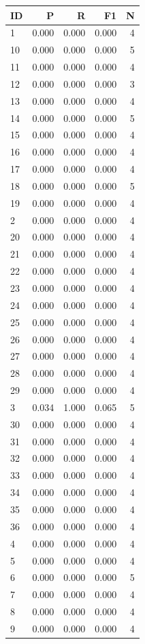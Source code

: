 \begin{tabular}{lrrrr}\toprule ID & P & R & F1 & N \\\midrule
1 & 0.000 & 0.000 & 0.000 & 4 \\
10 & 0.000 & 0.000 & 0.000 & 5 \\
11 & 0.000 & 0.000 & 0.000 & 4 \\
12 & 0.000 & 0.000 & 0.000 & 3 \\
13 & 0.000 & 0.000 & 0.000 & 4 \\
14 & 0.000 & 0.000 & 0.000 & 5 \\
15 & 0.000 & 0.000 & 0.000 & 4 \\
16 & 0.000 & 0.000 & 0.000 & 4 \\
17 & 0.000 & 0.000 & 0.000 & 4 \\
18 & 0.000 & 0.000 & 0.000 & 5 \\
19 & 0.000 & 0.000 & 0.000 & 4 \\
2 & 0.000 & 0.000 & 0.000 & 4 \\
20 & 0.000 & 0.000 & 0.000 & 4 \\
21 & 0.000 & 0.000 & 0.000 & 4 \\
22 & 0.000 & 0.000 & 0.000 & 4 \\
23 & 0.000 & 0.000 & 0.000 & 4 \\
24 & 0.000 & 0.000 & 0.000 & 4 \\
25 & 0.000 & 0.000 & 0.000 & 4 \\
26 & 0.000 & 0.000 & 0.000 & 4 \\
27 & 0.000 & 0.000 & 0.000 & 4 \\
28 & 0.000 & 0.000 & 0.000 & 4 \\
29 & 0.000 & 0.000 & 0.000 & 4 \\
3 & 0.034 & 1.000 & 0.065 & 5 \\
30 & 0.000 & 0.000 & 0.000 & 4 \\
31 & 0.000 & 0.000 & 0.000 & 4 \\
32 & 0.000 & 0.000 & 0.000 & 4 \\
33 & 0.000 & 0.000 & 0.000 & 4 \\
34 & 0.000 & 0.000 & 0.000 & 4 \\
35 & 0.000 & 0.000 & 0.000 & 4 \\
36 & 0.000 & 0.000 & 0.000 & 4 \\
4 & 0.000 & 0.000 & 0.000 & 4 \\
5 & 0.000 & 0.000 & 0.000 & 4 \\
6 & 0.000 & 0.000 & 0.000 & 5 \\
7 & 0.000 & 0.000 & 0.000 & 4 \\
8 & 0.000 & 0.000 & 0.000 & 4 \\
9 & 0.000 & 0.000 & 0.000 & 4 \\
\bottomrule\end{tabular}